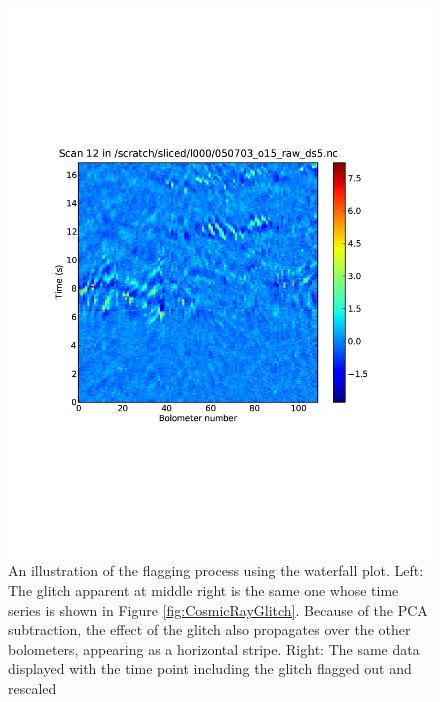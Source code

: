 \documentclass[12pt,preprint]{aastex}
\begin{document}
\begin{figure}
\begin{minipage}{3.25in}
\begin{center}
      \includegraphics[scale=0.5]{flagger_glitchgone}
    \end{center}
  \end{minipage}
  \caption{An illustration of the flagging process using the waterfall
plot. Left: The glitch apparent at middle right is the same one whose
time series is shown in Figure \ref{fig:CosmicRayGlitch}.  Because of
the PCA subtraction, the effect of the glitch also propagates over the
other bolometers, appearing as a horizontal stripe. Right: The same
data displayed with the time point including the glitch flagged out
and rescaled}

  \label{fig:Flagger}

  \addtocounter{figure}{-1} 
  \addtocounter{subfig}{1}
  

\end{figure}
\end{document}
